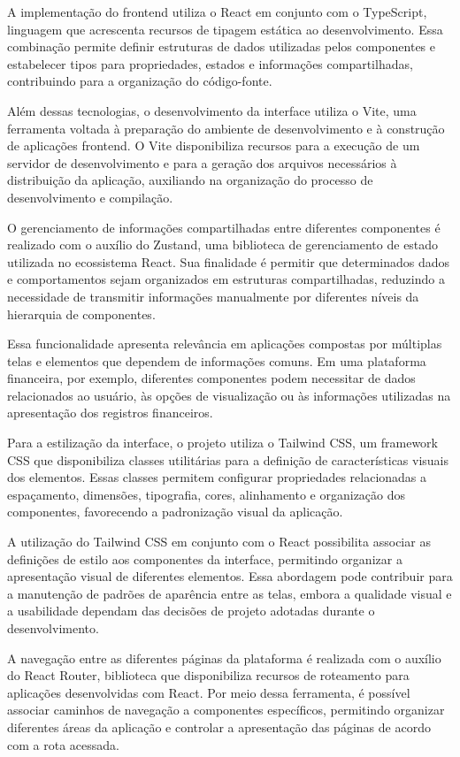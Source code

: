 A implementação do frontend utiliza o React em conjunto com o TypeScript, linguagem que acrescenta recursos de tipagem estática ao desenvolvimento. Essa combinação permite definir estruturas de dados utilizadas pelos componentes e estabelecer tipos para propriedades, estados e informações compartilhadas, contribuindo para a organização do código-fonte.

Além dessas tecnologias, o desenvolvimento da interface utiliza o Vite, uma ferramenta voltada à preparação do ambiente de desenvolvimento e à construção de aplicações frontend. O Vite disponibiliza recursos para a execução de um servidor de desenvolvimento e para a geração dos arquivos necessários à distribuição da aplicação, auxiliando na organização do processo de desenvolvimento e compilação.

O gerenciamento de informações compartilhadas entre diferentes componentes é realizado com o auxílio do Zustand, uma biblioteca de gerenciamento de estado utilizada no ecossistema React. Sua finalidade é permitir que determinados dados e comportamentos sejam organizados em estruturas compartilhadas, reduzindo a necessidade de transmitir informações manualmente por diferentes níveis da hierarquia de componentes.

Essa funcionalidade apresenta relevância em aplicações compostas por múltiplas telas e elementos que dependem de informações comuns. Em uma plataforma financeira, por exemplo, diferentes componentes podem necessitar de dados relacionados ao usuário, às opções de visualização ou às informações utilizadas na apresentação dos registros financeiros.

Para a estilização da interface, o projeto utiliza o Tailwind CSS, um framework CSS que disponibiliza classes utilitárias para a definição de características visuais dos elementos. Essas classes permitem configurar propriedades relacionadas a espaçamento, dimensões, tipografia, cores, alinhamento e organização dos componentes, favorecendo a padronização visual da aplicação.

A utilização do Tailwind CSS em conjunto com o React possibilita associar as definições de estilo aos componentes da interface, permitindo organizar a apresentação visual de diferentes elementos. Essa abordagem pode contribuir para a manutenção de padrões de aparência entre as telas, embora a qualidade visual e a usabilidade dependam das decisões de projeto adotadas durante o desenvolvimento.

A navegação entre as diferentes páginas da plataforma é realizada com o auxílio do React Router, biblioteca que disponibiliza recursos de roteamento para aplicações desenvolvidas com React. Por meio dessa ferramenta, é possível associar caminhos de navegação a componentes específicos, permitindo organizar diferentes áreas da aplicação e controlar a apresentação das páginas de acordo com a rota acessada.

